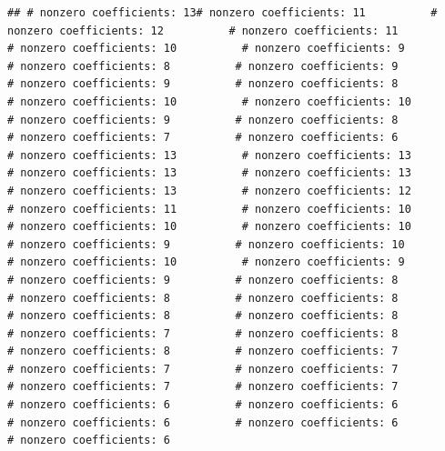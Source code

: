 \documentclass[
]{article}
\begin{document}
\begin{verbatim}
## # nonzero coefficients: 13# nonzero coefficients: 11          # nonzero coefficients: 12          # nonzero coefficients: 11          # nonzero coefficients: 10          # nonzero coefficients: 9          # nonzero coefficients: 8          # nonzero coefficients: 9          # nonzero coefficients: 9          # nonzero coefficients: 8          # nonzero coefficients: 10          # nonzero coefficients: 10          # nonzero coefficients: 9          # nonzero coefficients: 8          # nonzero coefficients: 7          # nonzero coefficients: 6          # nonzero coefficients: 13          # nonzero coefficients: 13          # nonzero coefficients: 13          # nonzero coefficients: 13          # nonzero coefficients: 13          # nonzero coefficients: 12          # nonzero coefficients: 11          # nonzero coefficients: 10          # nonzero coefficients: 10          # nonzero coefficients: 10          # nonzero coefficients: 9          # nonzero coefficients: 10          # nonzero coefficients: 10          # nonzero coefficients: 9          # nonzero coefficients: 9          # nonzero coefficients: 8          # nonzero coefficients: 8          # nonzero coefficients: 8          # nonzero coefficients: 8          # nonzero coefficients: 8          # nonzero coefficients: 7          # nonzero coefficients: 8          # nonzero coefficients: 8          # nonzero coefficients: 7          # nonzero coefficients: 7          # nonzero coefficients: 7          # nonzero coefficients: 7          # nonzero coefficients: 7          # nonzero coefficients: 6          # nonzero coefficients: 6          # nonzero coefficients: 6          # nonzero coefficients: 6          # nonzero coefficients: 6          
\end{verbatim}
\end{document}
